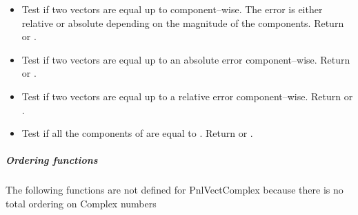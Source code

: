 \begin{itemize}
  \item {}
    \sshortdescribe Test if two vectors are equal up to  component--wise. The error  is either relative or absolute depending on the magnitude of the components. Return  or .
  \item {}
    \sshortdescribe Test if two vectors are equal up to an absolute error  component--wise. Return  or .
  \item {}
    \sshortdescribe Test if two vectors are equal up to a relative error  component--wise. Return  or .
  \item {}
    \sshortdescribe Test if all the components of  are equal to
    . Return  or .
\end{itemize}

\subparagraph{Ordering functions}
The following functions are not defined for PnlVectComplex because there is
no total ordering on Complex numbers

